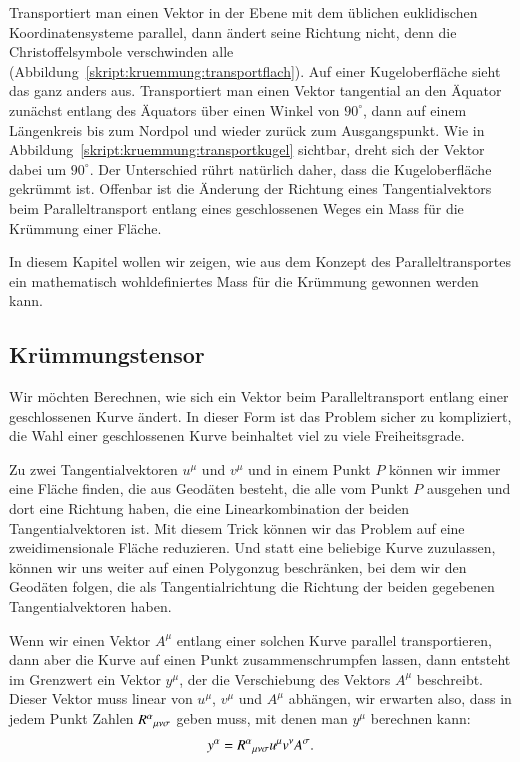 Transportiert man einen Vektor in der Ebene mit dem üblichen euklidischen
Koordinatensysteme parallel, dann ändert seine Richtung nicht,
denn die Christoffelsymbole verschwinden alle
(Abbildung~\ref{skript:kruemmung:transportflach}).
Auf einer Kugeloberfläche sieht das ganz anders aus.
Transportiert man einen Vektor tangential an den Äquator zunächst entlang 
des Äquators über einen Winkel von $90^\circ$, dann auf einem Längenkreis
bis zum Nordpol und wieder zurück zum Ausgangspunkt.
Wie in Abbildung~\ref{skript:kruemmung:transportkugel}
sichtbar, dreht sich der Vektor
dabei um $90^\circ$. 
Der Unterschied rührt natürlich daher, dass die Kugeloberfläche gekrümmt
ist.
Offenbar ist die Änderung der Richtung eines Tangentialvektors beim
Paralleltransport entlang eines geschlossenen Weges ein Mass für die
Krümmung einer Fläche.

In diesem Kapitel wollen wir zeigen, wie aus dem Konzept des
Paralleltransportes ein mathematisch wohldefiniertes Mass für die
Krümmung gewonnen werden kann.

\subsection{Krümmungstensor}
Wir möchten Berechnen, wie sich ein Vektor beim Paralleltransport entlang
einer geschlossenen Kurve ändert.
In dieser Form ist das Problem sicher zu kompliziert, die Wahl
einer geschlossenen Kurve beinhaltet viel zu viele Freiheitsgrade.

Zu zwei Tangentialvektoren $u^\mu$ und $v^\mu$ und in einem Punkt
$P$ können wir immer eine
Fläche finden, die aus Geodäten besteht, die alle vom Punkt $P$ ausgehen
und dort eine Richtung haben, die eine Linearkombination der beiden
Tangentialvektoren ist.
Mit diesem Trick können wir das Problem auf eine zweidimensionale
Fläche reduzieren.
Und statt eine beliebige Kurve zuzulassen, können wir uns weiter
auf einen Polygonzug beschränken, bei dem wir den Geodäten folgen,
die als Tangentialrichtung die Richtung der beiden gegebenen
Tangentialvektoren haben.

Wenn wir einen Vektor $A^\mu$ entlang einer solchen Kurve parallel
transportieren, dann aber die Kurve auf einen Punkt zusammenschrumpfen
lassen, dann entsteht im Grenzwert ein Vektor $y^\mu$,
der die Verschiebung des Vektors $A^\mu$ beschreibt.
Dieser Vektor muss linear von $u^\mu$, $v^\mu$ und $A^\mu$ abhängen,
wir erwarten also, dass in jedem Punkt Zahlen
$R^\alpha\mathstrut_{\mu\nu\sigma}$ geben muss, mit denen man
$y^\mu$ berechnen kann:
\[
y^\alpha = R^\alpha\mathstrut_{\mu\nu\sigma}u^\mu v^\nu A^\sigma.
\]

